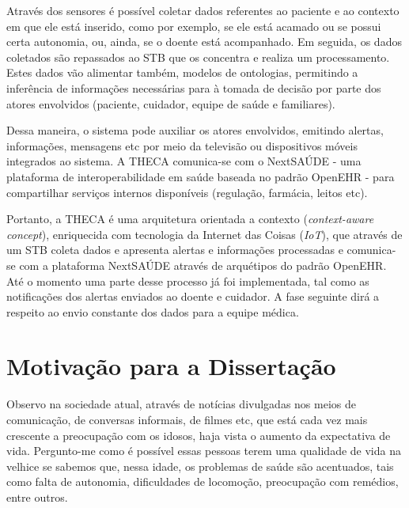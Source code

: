 Através dos sensores é possível coletar dados referentes ao paciente e ao
contexto em que ele está inserido, como por exemplo, se ele está acamado ou se
possui certa autonomia, ou, ainda, se o doente está acompanhado.  Em seguida, os
dados coletados são repassados ao STB que  os concentra e realiza um
processamento. Estes dados vão alimentar também, modelos de ontologias, 
permitindo a inferência de informações necessárias para à tomada de decisão
por parte dos atores  envolvidos (paciente, cuidador, equipe de saúde e 
familiares). 

Dessa maneira, o sistema pode auxiliar os atores envolvidos, emitindo alertas,
informações, mensagens etc por meio da televisão ou dispositivos móveis
integrados ao sistema. A THECA comunica-se com o NextSAÚDE - uma plataforma
de interoperabilidade em saúde baseada no padrão OpenEHR - para compartilhar
serviços internos disponíveis (regulação, farmácia, leitos etc).

Portanto, a THECA é uma arquitetura orientada a contexto (\textit{context-aware
concept}), enriquecida com tecnologia da Internet das Coisas (\textit{IoT}), que
através de um STB coleta dados e apresenta alertas e informações processadas e
comunica-se com a plataforma NextSAÚDE através de arquétipos do padrão OpenEHR.
Até o momento uma parte desse processo já foi implementada, tal como as 
notificações dos alertas enviados ao doente e cuidador. A fase seguinte 
dirá a respeito ao envio constante dos dados para a equipe médica.


\section{Motivação para a Dissertação}\label{sec:motivacao}

Observo na sociedade atual, através de notícias divulgadas nos meios
de comunicação, de conversas informais, de filmes etc, que está cada
vez mais crescente a preocupação com os idosos, haja vista o
aumento da expectativa de vida. Pergunto-me como é possível essas pessoas
terem uma qualidade de vida na velhice se sabemos que, nessa idade,
os problemas de saúde são acentuados, tais como falta de autonomia,
dificuldades de locomoção, preocupação com remédios, entre outros.

